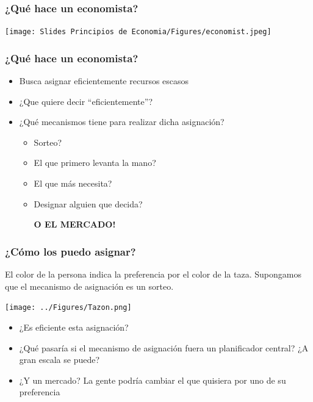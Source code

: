 \documentclass{beamer}
\begin{document}
\begin{frame}
\frametitle{¿Qu\'{e} hace un economista?}
    \centering 
    \texttt{[image: Slides Principios de Economia/Figures/economist.jpeg]}
    \\
\end{frame}


\begin{frame}
    \frametitle{¿Qu\'{e} hace un economista?}
    \begin{itemize}
        \item Busca asignar eficientemente recursos escasos \vspace{3mm} \\
        \item ¿Que quiere decir ``eficientemente''? \vspace{3mm} \\
        \item ¿Qué mecanismos tiene para realizar dicha asignación? 
        \begin{itemize}
            \item Sorteo?
            \item El que primero levanta la mano?
            \item El que más necesita?
            \item Designar alguien que decida?
            \begin{boxA}
            \begin{center}
                \textbf{O EL MERCADO!}
            \end{center}
            \end{boxA}
        \end{itemize}
    \end{itemize}
\end{frame}

\begin{frame}
    \frametitle{¿Cómo los puedo asignar?}
    El color de la persona indica la preferencia por el color de la taza. Supongamos que el mecanismo de asignación es un sorteo.
    \begin{center}
        \texttt{[image: ../Figures/Tazon.png]}
    \end{center}
    \begin{itemize}
        \item ¿Es eficiente esta asignación?
        \item ¿Qué pasaría si el mecanismo de asignación fuera un planificador central? ¿A gran escala se puede?
        \item ¿Y un mercado? La gente podría cambiar el que quisiera por uno de su preferencia
    \end{itemize}
\end{frame}
\end{document}
